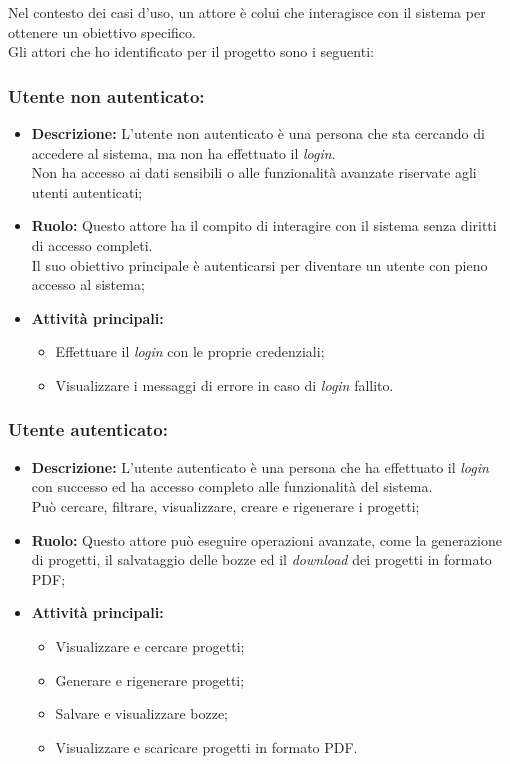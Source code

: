 Nel contesto dei casi d'uso, un attore è colui che interagisce con il sistema per ottenere un obiettivo specifico.\\
Gli attori che ho identificato per il progetto sono i seguenti:

\subsubsection*{Utente non autenticato:}

\begin{itemize}
    \item \textbf{Descrizione:}  L'utente non autenticato è una persona che sta cercando di accedere al sistema, ma non ha effettuato il \textit{login}.\\
    Non ha accesso ai dati sensibili o alle funzionalità avanzate riservate agli utenti autenticati;
    \item \textbf{Ruolo:} Questo attore ha il compito di interagire con il sistema senza diritti di accesso completi.\\
    Il suo obiettivo principale è autenticarsi per diventare un utente con pieno accesso al sistema;
    \item \textbf{Attività principali:}
        \begin{itemize}
            \item Effettuare il \textit{login} con le proprie credenziali;
            \item Visualizzare i messaggi di errore in caso di \textit{login} fallito.
        \end{itemize}
\end{itemize}

\subsubsection*{Utente autenticato:}

\begin{itemize}
    \item \textbf{Descrizione:}  L'utente autenticato è una persona che ha effettuato il \textit{login} con successo ed ha accesso completo alle funzionalità del sistema.\\
    Può cercare, filtrare, visualizzare, creare e rigenerare i progetti;
    \item \textbf{Ruolo:} Questo attore può eseguire operazioni avanzate, come la generazione di progetti, il salvataggio delle bozze ed il \textit{download} dei progetti in formato PDF;
    \item \textbf{Attività principali:}
        \begin{itemize}
            \item Visualizzare e cercare progetti;
            \item Generare e rigenerare progetti;
            \item Salvare e visualizzare bozze;
            \item Visualizzare e scaricare progetti in formato PDF.
        \end{itemize}
\end{itemize}

